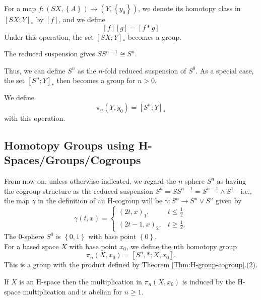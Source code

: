   For a map $f \colon \left( SX, \left\{ A \right\}  \right) 
  \to \left( Y, \left\{ y_0 \right\}  \right) $, we denote its
  homotopy class in
  $\left[ SX; Y \right]_{*}$ by
  $\left[ f \right] $, and we define
  \[
  \left[ f \right] \left[ g \right] =
  \left[ f*g\right] 
  \] 
  Under this operation, the set
  $\left[ SX;Y \right]_*$ becomes a group.

  \begin{proposition}[]
      The reduced suspension gives
      $S S^{n-1}\cong S^{n}$.
  \end{proposition}

  Thus, we can define $S^{n}$ as the $n$-fold reduced
  suspension of $S^{0}$. As a special case,
  the set $\left[ S^{n};Y \right]_*$ then becomes
  a group for $n>0$. 

  \begin{definition}
      We define
      \[
      \pi_n \left( Y, y_0 \right) =
      \left[ S^{n}; Y \right]_*
      \] 
      with this operation.
  \end{definition}

  \subsection{Homotopy Groups using H-Spaces/Groups/Cogroups}

  From now on, unless otherwise indicated, we regard
  the $n$-sphere $S^{n}$ as having the cogroup
  structure as the reduced suspension
  $S^{n} = S S^{n-1} = S^{n-1} \wedge S^{1}$ - i.e.,
  the map $\gamma$ in the definition of an H-cogroup will
  be $\gamma \colon S^{n} \to S^{n} \vee S^{n}$ 
  given by
  \[
  \gamma(t,x) = 
  \begin{cases}
      \left( 2t,x \right)_{1},& t\le \frac{1}{2}\\
      \left( 2t-1, x \right)_2,& t\ge \frac{1}{2}.
  \end{cases}
  \] 
  The
  $0$-sphere $S^{0}$ is $\left\{ 0,1 \right\} $ 
  with base point $\left\{ 0 \right\} $.\\

  For a based space $X$ with base point $x_0$, we define
  the nth homotopy group
  \[
  \pi_n (X,x_0) = 
  \left[ S^{n},* ; X, x_0 \right] .
  \] 
  This is a group with the product defined by
  Theorem \ref{Thm:H-group-cogroup}.(2).

  \begin{theorem}[]\label{Theorem:Htpy-Groups-Abelian}
      If $X$ is an H-space then the multiplication
      in $\pi_n (X,x_0)$ is induced by
      the H-space multiplication and is abelian for
      $n\ge 1$.
  \end{theorem}

